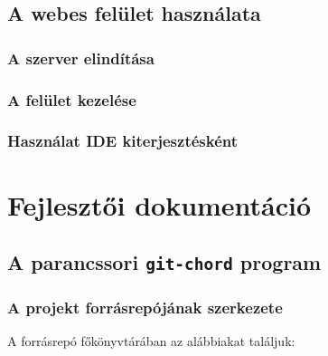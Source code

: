 \documentclass[
]{elteikthesis}[2025/03/25]
\begin{document}
\section{A webes felület használata}

\subsection{A szerver elindítása}


\subsection{A felület kezelése}


\subsection{Használat IDE kiterjesztésként}


\cleardoublepage

\chapter{Fejlesztői dokumentáció}

\section{A parancssori \texttt{git-chord} program}

\subsection{A projekt forrásrepójának szerkezete}

A forrásrepó főkönyvtárában az alábbiakat találjuk:
\end{document}
